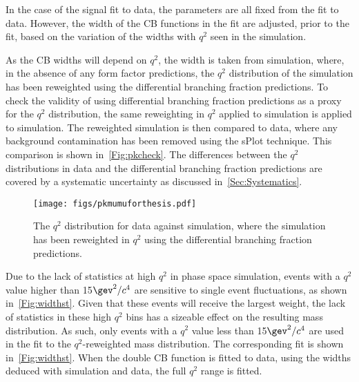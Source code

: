 In the case of the signal fit to \Lbpi data, the parameters are all fixed from the fit to \Lbpijpsi data. However, the width of the CB functions in the \Lbpi fit are adjusted, prior to the fit, based on the variation of the widths with $q^{2}$ seen in the simulation.


As the CB widths will depend on $q^{2}$, the width is taken from \Lbpi simulation, where, in the absence of any form factor predictions, the $q^{2}$ distribution of the simulation has been reweighted using the \LbL differential branching fraction predictions. To check the validity of using \LbL differential branching fraction predictions as a proxy for the \Lbpi $q^{2}$ distribution, the same reweighting in $q^{2}$ applied to \Lbpi simulation is applied to \LbK simulation. The reweighted \LbK simulation is then compared to \LbK data, where any background contamination has been removed using the sPlot technique. This comparison is shown in~\autoref{Fig:pkcheck}. The differences between the $q^{2}$ distributions in \LbK data and the \LbL differential branching fraction predictions are covered by a systematic uncertainty as discussed in~\autoref{Sec:Systematics}.
\begin{figure}[!ht]\def\nh{0.3\textwidth}
  \centering
  \texttt{[image: figs/pkmumuforthesis.pdf]}
    \caption{The $q^{2}$ distribution for \LbK data against \LbK simulation, where the \LbK simulation has been reweighted in $q^{2}$ using the \LbL differential branching fraction predictions.}
    \label{Fig:pkcheck}
\end{figure}

Due to the lack of statistics at high $q^{2}$ in \Lbpi phase space simulation, events with a $q^{2}$ value higher than 15$\gev^{2}/c^{4}$ are sensitive to single event fluctuations, as shown in~\autoref{Fig:widthst}\protect{}. Given that these events will receive the largest weight, the lack of statistics in these high $q^{2}$ bins has a sizeable effect on the resulting mass distribution. As such, only events with a $q^{2}$ value less than 15$\gev^{2}/c^{4}$ are used in the fit to the $q^{2}$-reweighted \Lbpi mass distribution. The corresponding fit is shown in~\autoref{Fig:widthst}\protect{}. When the double CB function is fitted to \Lbpi data, using the widths deduced with simulation and \Lbpijpsi data, the full $q^{2}$ range is fitted. 


